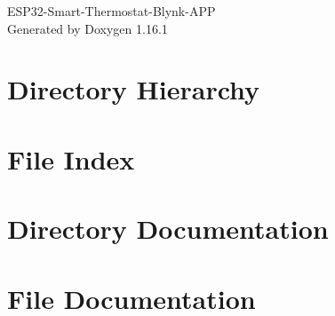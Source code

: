 \documentclass[twoside]{book}
\newcommand{\+}{\discretionary{\mbox{\scriptsize$\hookleftarrow$}}{}{}}
\newcommand{\clearemptydoublepage}{%
    \newpage{\pagestyle{empty}\cleardoublepage}%
  }
\begin{document}
  \raggedbottom
    \hypersetup{pageanchor=false,
                bookmarksnumbered=true,
                pdfencoding=unicode
               }
  \begin{titlepage}
  \vspace*{7cm}
  \begin{center}%
  {\Large ESP32-\/\+Smart-\/\+Thermostat-\/\+Blynk-\/\+APP}\\
  \vspace*{1cm}
  {\large Generated by Doxygen 1.16.1}\\
  \end{center}
  \end{titlepage}
  \clearemptydoublepage
  \tableofcontents
  \clearemptydoublepage
  \hypersetup{pageanchor=true}

\chapter{Directory Hierarchy}

\chapter{File Index}

\chapter{Directory Documentation}

\chapter{File Documentation}


  \backmatter
  \newpage
  \clearemptydoublepage
  \printindex
\end{document}
